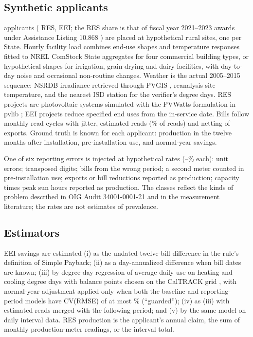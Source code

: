\documentclass[10pt]{article}
\begin{document}
\subsection{Synthetic applicants}
\NApplicants{} applicants (\NRes{} RES, \NEei{} EEI; the RES share is that of fiscal year
2021--2023 awards under Assistance Listing 10.868 \cite{usaspending10868}) are placed at
\NStates{} hypothetical rural sites, one per State. Hourly facility load combines end-use
shapes and temperature responses fitted to NREL ComStock State aggregates
\cite{wilson2022enduse} for four commercial building types, or hypothetical shapes for
irrigation, grain-drying and dairy facilities, with day-to-day noise and occasional
non-routine changes. Weather is the actual 2005--2015 sequence: NSRDB irradiance
\cite{sengupta2018national} retrieved through PVGIS \cite{pvgis_api}, reanalysis site
temperature, and the nearest ISD station \cite{smith2011integrated} for the verifier's
degree days. RES projects are photovoltaic systems simulated with the PVWatts formulation
in pvlib \cite{dobos2014pvwatts,holmgren2018pvlib}; EEI projects reduce specified end
uses from the in-service date. Bills follow monthly read cycles with jitter, estimated
reads (\CfgEstimatedProb\% of reads) and netting of exports. Ground truth is known for
each applicant: production in the twelve months after installation, pre-installation
use, and normal-year savings.

One of six reporting errors is injected at hypothetical rates
(\CfgRateUnit--\CfgRateTransposed\% each): unit errors; transposed digits; bills from the
wrong period; a second meter counted in pre-installation use; exports or bill reductions
reported as production; capacity times peak sun hours reported as production. The classes
reflect the kinds of problem described in OIG Audit 34001-0001-21 \cite{oig2016reap} and
in the measurement literature; the rates are not estimates of prevalence.

\subsection{Estimators}
EEI savings are estimated (i) as the undated twelve-bill difference in the rule's
definition of Simple Payback; (ii) as a day-annualized difference when bill dates are
known; (iii) by degree-day regression of average daily use on heating and cooling degree
days with balance points chosen on the CalTRACK grid \cite{caltrack2methods}, with
normal-year adjustment applied only when both the baseline and reporting-period models
have CV(RMSE) of at most \CfgCvrmseMax\% (``guarded''); (iv) as (iii) with estimated reads
merged with the following period; and (v) by the same model on daily interval data. RES
production is the applicant's annual claim, the sum of monthly production-meter readings,
or the interval total.
\end{document}
